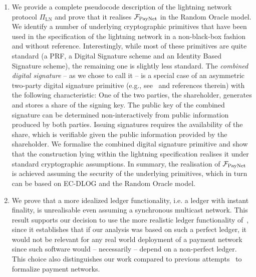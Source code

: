 \begin{enumerate}
\item We provide a complete pseudocode description of the lightning network
protocol $\Pi_{\mathrm{LN}}$ and prove that it realises $\mathcal{F}_{\mathrm{PayNet}}{}$ in the
Random Oracle model. We identify a number of underlying cryptographic primitives
that have been used in the specification of the lightning network in a
non-black-box fashion and without reference. Interestingly, while most of these
primitives are quite standard (a PRF, a Digital Signature scheme and an Identity
Based Signature scheme), the remaining one is slightly less standard. The
\emph{combined digital signature} -- as we chose to call it -- is a special case
of an asymmetric two-party digital signature primitive (e.g.,
see~\cite{DBLP:conf/ndss/NicolosiKDM03} and references therein) with the
following characteristic: One of the two parties, the shareholder, generates and
stores a share of the signing key. The public key of the combined signature can
be determined non-interactively from public information produced by both
parties. Issuing signatures requires the availability of the share, which is
verifiable given the public information provided by the shareholder. We
formalise the combined digital signature primitive and show that the
construction lying within the lightning specification realises it under standard
cryptographic assumptions. In summary, the realisation of $\mathcal{F}_{\mathrm{PayNet}}{}$ is
achieved assuming the security of the underlying primitives, which in turn can
be based on EC-DLOG and the Random Oracle model.

\item We prove that a more idealized ledger functionality, i.e. a ledger with
instant finality, is unrealisable even assuming a synchronous multicast network.
This result supports our decision to use the more realistic ledger functionality
of~\cite{BMTZ17}, since it establishes that if our analysis was based on such a
perfect ledger, it would not be relevant for any real world deployment of a
payment network since such software would -- necessarily -- depend on a
non-perfect ledger. This choice also distinguishes our work compared to previous
attempts~\cite{DBLP:conf/ccs/DziembowskiFH18,Malavolta:2017:CPP:3133956.3134096,sprites,perun}
to formalize payment networks.
\end{enumerate}

